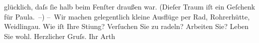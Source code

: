\begin{ledgroupsized}[t]{13cm}
               glücklich, daſs ſie halb beim Fenſter draußen war. (Dieſer Traum iſt ein Geſchenk für
                  Paula. –)\pend
           \pstart
           – Wir machen gelegentlich kleine Aus{\pb}flüge per Rad,
                  Rohrerhütte, Weidlingau.\pend
           \pstart
           Wie iſt Ihre Sti{\geminationm}ung? Verſuchen Sie zu radeln? Arbeiten
               Sie?\pend
           \pstart
           Leben Sie wohl. Herzlicher Gruſs. Ihr \spacefill\mbox{Arth}\pend
           
         
         \endnumbering{}\end{ledgroupsized}  \newcommand{\dateiname}{L00809}\newcommand{\titel}{Arthur Schnitzler an Richard Beer-Hofmann, 28. 6. 1898}\newcommand{\editorInnen}{Martin Anton Müller und Gerd-Hermann Susen}
      